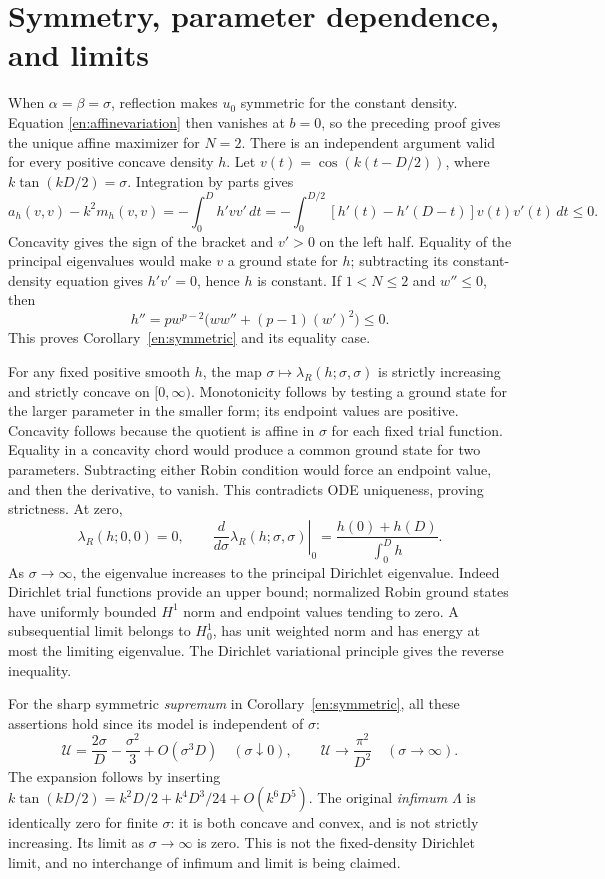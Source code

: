 \documentclass[12pt]{amsart}
\theoremstyle{definition}
\theoremstyle{remark}
\numberwithin{equation}{section}
\begin{document}
\section{Symmetry, parameter dependence, and limits}
When $\alpha=\beta=\sigma$, reflection makes $u_0$ symmetric for the constant density. Equation \eqref{en:affinevariation} then vanishes at $b=0$, so the preceding proof gives the unique affine maximizer for $N=2$.
There is an independent argument valid for every positive concave density $h$. Let
$v(t)=\cos(k(t-D/2))$, where $k\tan(kD/2)=\sigma$. Integration by parts gives
\[
 a_h(v,v)-k^2m_h(v,v)=-\int_0^D h'vv'\,dt
 =-\int_0^{D/2}[h'(t)-h'(D-t)]v(t)v'(t)\,dt\le0.
\]
Concavity gives the sign of the bracket and $v'>0$ on the left half. Equality of the principal eigenvalues would make $v$ a ground state for $h$; subtracting its constant-density equation gives $h'v'=0$, hence $h$ is constant. If $1<N\le2$ and $w''\le0$, then
\[
 h''=p w^{p-2}\bigl(ww''+(p-1)(w')^2\bigr)\le0.
\]
This proves Corollary~\ref{en:symmetric} and its equality case.

For any fixed positive smooth $h$, the map $\sigma\mapsto\lambda_R(h;\sigma,\sigma)$ is strictly increasing and strictly concave on $[0,\infty)$. Monotonicity follows by testing a ground state for the larger parameter in the smaller form; its endpoint values are positive. Concavity follows because the quotient is affine in $\sigma$ for each fixed trial function. Equality in a concavity chord would produce a common ground state for two parameters. Subtracting either Robin condition would force an endpoint value, and then the derivative, to vanish. This contradicts ODE uniqueness, proving strictness. At zero,
\[
 \lambda_R(h;0,0)=0,\qquad
 \left.\frac{d}{d\sigma}\lambda_R(h;\sigma,\sigma)\right|_{0}
 =\frac{h(0)+h(D)}{\int_0^Dh}.
\]
As $\sigma\to\infty$, the eigenvalue increases to the principal Dirichlet eigenvalue. Indeed Dirichlet trial functions provide an upper bound; normalized Robin ground states have uniformly bounded $H^1$ norm and endpoint values tending to zero. A subsequential limit belongs to $H^1_0$, has unit weighted norm and has energy at most the limiting eigenvalue. The Dirichlet variational principle gives the reverse inequality.

For the sharp symmetric \emph{supremum} in Corollary~\ref{en:symmetric}, all these assertions hold since its model is independent of $\sigma$:
\[
 \mathcal U=\frac{2\sigma}{D}-\frac{\sigma^2}{3}+O(\sigma^3D)
 \quad(\sigma\downarrow0),\qquad
 \mathcal U\longrightarrow\frac{\pi^2}{D^2}\quad(\sigma\to\infty).
\]
The expansion follows by inserting $k\tan(kD/2)=k^2D/2+k^4D^3/24+O(k^6D^5)$. The original \emph{infimum} $\Lambda$ is identically zero for finite $\sigma$: it is both concave and convex, and is not strictly increasing. Its limit as $\sigma\to\infty$ is zero. This is not the fixed-density Dirichlet limit, and no interchange of infimum and limit is being claimed.
\end{document}
